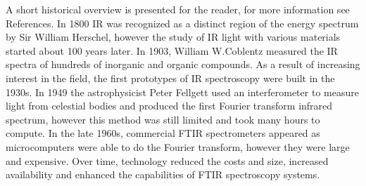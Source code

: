 \documentclass[reprint,amsmath,amssymb,aps, prl,superscriptaddress]{revtex4-2}
\begin{document}
A short historical overview is presented for the reader, for more information see References.
In 1800 IR was recognized as a distinct region of the energy spectrum by Sir William Herschel, however the study of IR light with various materials started about 100 years later. In 1903, William W.Coblentz measured the IR spectra of hundreds of inorganic and organic compounds\cite{scitool}.
As a result of increasing interest in the field, the first prototypes of IR spectroscopy were built in the 1930s.  In 1949 the astrophysicist Peter Fellgett used an interferometer to measure light from celestial bodies and produced the first Fourier transform infrared spectrum, however this method was still limited and took many hours to compute. In the late 1960s, commercial FTIR spectrometers appeared as
microcomputers were able to do the Fourier transform, however
they were large and expensive. Over time, technology reduced the costs and size,
increased availability and enhanced the capabilities of FTIR spectroscopy systems\cite{spechistory}.
\end{document}
